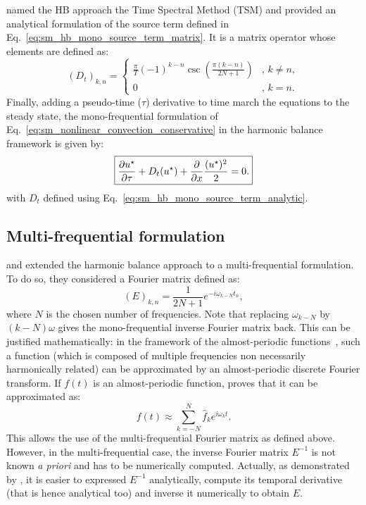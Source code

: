 \citet{Gopinath2005} named the HB approach the 
Time Spectral Method (TSM) and provided 
an analytical formulation of the
source term defined in Eq.~\eqref{eq:sm_hb_mono_source_term_matrix}.
It is a matrix operator whose elements are defined as:
\begin{equation}
  (D_t)_{k, n} =
  \begin{cases}
    \frac{\pi}{T}(-1)^{k-n}\csc\left(\frac{\pi
        (k-n)}{2N+1}\right) &, \, k\neq n,\\
    0 &, \, k=n.
  \end{cases}
  \label{eq:sm_hb_mono_source_term_analytic}
\end{equation}
Finally, adding a pseudo-time ($\tau$) derivative to 
time march the equations to the steady state, 
the mono-frequential formulation of 
Eq.~\eqref{eq:sm_nonlinear_convection_conservative} in the harmonic
balance framework is given by:
\begin{equation}
	\fbox{$
	\displaystyle \frac{\partial u^\star}{\partial \tau} + 
	D_t (u^\star) + 
	\displaystyle \frac{\partial}{\partial x}
		\frac{(u^\star)^2}{2} = 0.
	$}
\end{equation}
with $D_t$ defined using Eq.~\eqref{eq:sm_hb_mono_source_term_analytic}.

\subsection{Multi-frequential formulation}
\label{sec:sm_hb_multi}
\citet{Gopinath2007} and \citet{Ekici2007} 
extended the harmonic balance approach to
a multi-frequential formulation. To do so, they considered
a Fourier matrix defined as:
\begin{equation}
	(E)_{k,n} = \frac{1}{2N+1} e^{-i \omega_{k-N} t_n},
\end{equation}
where $N$ is the chosen number of frequencies.
Note that replacing $\omega_{k-N}$ by $(k - N) \omega$ gives
the mono-frequential inverse Fourier matrix back. 
This can be justified mathematically: in the
framework of the almost-periodic functions~\cite{Besicovitch1932},
such a function (which is composed of multiple
frequencies non necessarily harmonically related) can be approximated
by an almost-periodic
discrete Fourier transform. If $f(t)$ is an almost-periodic function,
\citet{Besicovitch1932} proves that it can be approximated as:
\begin{equation}
	f(t) \approx \sum_{k=-N}^{N} \widehat{f}_k 
	e^{i \omega_k t}.
\end{equation}
This allows the use of the multi-frequential Fourier matrix as defined
above. However, in the multi-frequential case, the inverse Fourier matrix
$E^{-1}$ is not known \textit{a priori} 
and has to be numerically computed. Actually, as demonstrated by 
\citet{Gopinath2007}, it is easier to expressed $E^{-1}$ analytically,
compute its temporal derivative (that is hence analytical too) 
and inverse it numerically to obtain $E$.

